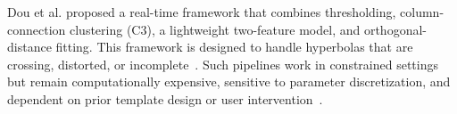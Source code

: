 \documentclass[lettersize,journal]{IEEEtran}
\begin{document}
Dou et al. proposed a real-time framework that combines thresholding,
column-connection clustering (C3), a lightweight two-feature model, and
orthogonal-distance fitting. This framework is designed to handle hyperbolas
that are crossing, distorted, or incomplete~\cite{Dou2016Real-Time}. Such
pipelines work in constrained settings but remain computationally expensive,
sensitive to parameter discretization, and dependent on prior template design or
user
intervention~\cite{lei2020cnnlstm,pham2018fasterrcnn,Sagnard2016Template-matching,kafedziski2018c3hough}.
\end{document}
